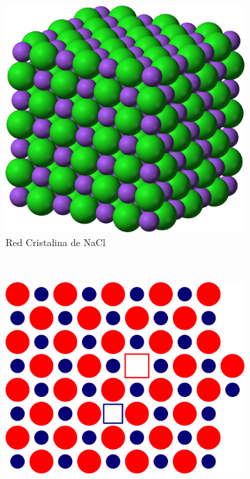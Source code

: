\documentclass[a4paper,11pt]{article}
\begin{document}
\begin{figure}[b]
    \centering
    \begin{subfigure}[b]{0.3\textwidth}
        \includegraphics[width=\textwidth]{figs/NaCl.png}
        \caption{Red Cristalina de NaCl}
        \label{fig:nacl}
    \end{subfigure}
    ~
    \begin{subfigure}[b]{0.3\textwidth}
        \includegraphics[width=\textwidth]{figs/schottky.png}

\end{subfigure}
\end{figure}
\end{document}
